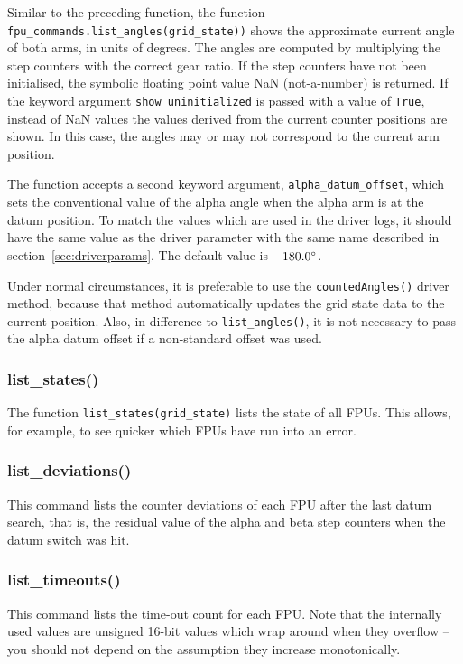 \documentclass[11pt,a4paper]{scrartcl}
\begin{document}
Similar to the preceding function, the function
\texttt{fpu\_commands.list\_angles(grid\_state))} shows the
approximate current angle of both arms, in units of degrees. The
angles are computed by multiplying the step counters with the correct
gear ratio. If the step counters have not been initialised, the
symbolic floating point value NaN (not-a-number) is returned.  If the
keyword argument \texttt{show\_uninitialized} is passed with a value
of \texttt{True}, instead of NaN values the values derived from the
current counter positions are shown. In this case, the angles may or
may not correspond to the current arm position.

 The function accepts a second keyword
argument, \texttt{alpha\_datum\_offset}, which sets the conventional
value of the alpha angle when the alpha arm is at the datum position.
To match the values which are used in the driver logs, it should have
the same value as the driver parameter with the same name described in
section~\ref{sec:driverparams}. The default value is $-180.0\degree$.

Under normal circumstances, it is preferable to use the
\texttt{countedAngles()} driver method, because that method
automatically updates the grid state data to the current position.
Also, in difference to \texttt{list\_angles()}, it is not necessary
  to pass the alpha datum offset if a non-standard offset was used.

\subsubsection{list\_states()}
\label{sec:liststates}

The function \texttt{list\_states(grid\_state)} lists the state of all
FPUs. This allows, for example, to see quicker which FPUs have run into an error.

\subsubsection{list\_deviations()}
This command lists the counter deviations of each FPU after the last
datum search, that is, the residual value of the alpha and beta step
counters when the datum switch was hit.

\subsubsection{list\_timeouts()}
 This command lists the time-out count for
each FPU. Note that the internally used values are unsigned 16-bit
values which wrap around when they overflow -- you should not depend
on the assumption they increase monotonically.
\end{document}

